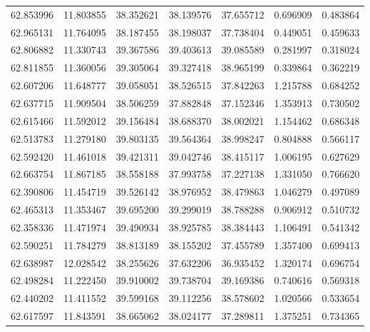 \begin{tabular}{rrrrrrr}
 62.853996 &  11.803855 &         38.352621 &         38.139576 &         37.655712 &  0.696909 &  0.483864 \\
 62.965131 &  11.764095 &         38.187455 &         38.198037 &         37.738404 &  0.449051 &  0.459633 \\
 62.806882 &  11.330743 &         39.367586 &         39.403613 &         39.085589 &  0.281997 &  0.318024 \\
 62.811855 &  11.360056 &         39.305064 &         39.327418 &         38.965199 &  0.339864 &  0.362219 \\
 62.607206 &  11.648777 &         39.058051 &         38.526515 &         37.842263 &  1.215788 &  0.684252 \\
 62.637715 &  11.909504 &         38.506259 &         37.882848 &         37.152346 &  1.353913 &  0.730502 \\
 62.615466 &  11.592012 &         39.156484 &         38.688370 &         38.002021 &  1.154462 &  0.686348 \\
 62.513783 &  11.279180 &         39.803135 &         39.564364 &         38.998247 &  0.804888 &  0.566117 \\
 62.592420 &  11.461018 &         39.421311 &         39.042746 &         38.415117 &  1.006195 &  0.627629 \\
 62.663754 &  11.867185 &         38.558188 &         37.993758 &         37.227138 &  1.331050 &  0.766620 \\
 62.390806 &  11.454719 &         39.526142 &         38.976952 &         38.479863 &  1.046279 &  0.497089 \\
 62.465313 &  11.353467 &         39.695200 &         39.299019 &         38.788288 &  0.906912 &  0.510732 \\
 62.358336 &  11.471974 &         39.490934 &         38.925785 &         38.384443 &  1.106491 &  0.541342 \\
 62.590251 &  11.784279 &         38.813189 &         38.155202 &         37.455789 &  1.357400 &  0.699413 \\
 62.638987 &  12.028542 &         38.255626 &         37.632206 &         36.935452 &  1.320174 &  0.696754 \\
 62.498284 &  11.222450 &         39.910002 &         39.738704 &         39.169386 &  0.740616 &  0.569318 \\
 62.440202 &  11.411552 &         39.599168 &         39.112256 &         38.578602 &  1.020566 &  0.533654 \\
 62.617597 &  11.843591 &         38.665062 &         38.024177 &         37.289811 &  1.375251 &  0.734365 \\

\end{tabular}
